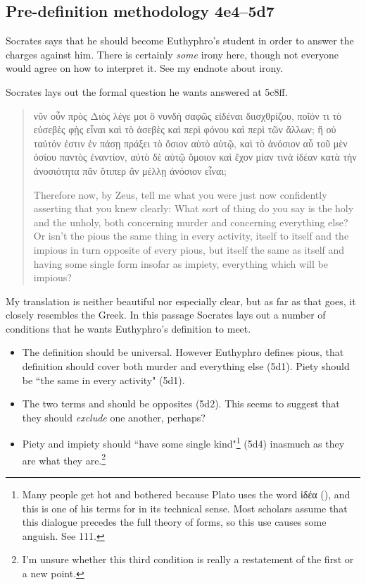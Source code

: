 \documentclass[11pt]{article}
\begin{document}

\subsection{Pre-definition methodology 4e4--5d7}

Socrates says that he should become Euthyphro's student in order to answer
the charges against him.  There is certainly \emph{some} irony here, though
not everyone would agree on how to interpret it.  See my endnote about
irony.

Socrates lays out the formal question he wants answered at 5c8ff.

\begin{quote}

    {\g
    νῦν οὖν πρὸς Διὸς λέγε μοι ὃ νυνδὴ σαφῶς εἰδέναι διισχθρίζου, ποῖόν τι
    τὸ εὐσεβὲς φῂς εἶναι καὶ τὸ ἀσεβὲς καὶ περὶ φόνου καὶ περὶ τῶν ἄλλων;
    ἢ οὐ ταὐτόν ἐστιν ἐν πάσῃ πράξει τὸ ὅσιον αὐτὸ αὑτῷ, καὶ τὸ ἀνόσιον αὖ
    τοῦ μὲν ὁσίου παντὸς ἐναντίον, αὐτὸ δὲ αὑτῷ ὅμοιον καὶ ἔχον μίαν τινὰ
    ἰδέαν κατὰ τὴν ἀνοσιότητα πᾶν ὅτιπερ ἂν μέλλῃ ἀνόσιον εἶναι;
    }

    Therefore now, by Zeus, tell me what you were just now confidently
    asserting that you knew clearly: What sort of thing do you say is the
    holy and the unholy, both concerning murder and concerning everything
    else? Or isn't the pious the same thing in every activity, itself to
    itself and the impious in turn opposite of every pious, but itself the
    same as itself and having some single form insofar as impiety,
    everything which will be impious?

\end{quote}

My translation is neither beautiful nor especially clear, but as far as
that goes, it closely resembles the Greek.  In this passage Socrates lays
out a number of conditions that he wants Euthyphro's definition to meet.

\begin{itemize}
    \item The definition should be universal.  However Euthyphro defines
        pious, that definition should cover both murder and everything else
        (5d1).  Piety should be ``the same in every activity" (5d1).
    \item The two terms  and  should be opposites
        (5d2).  This seems to suggest that they should \emph{exclude} one
        another, perhaps?
    \item Piety and impiety should ``have some single kind"\footnote{Many
        people get hot and bothered because Plato uses the word {\g ἰδέα}
        (), and this is one of his terms for  in
        its technical sense.  Most scholars assume that this dialogue
        precedes the full theory of forms, so this use causes some anguish.
        See \citet{burnet1924} 111.} (5d4) inasmuch as they are what they
        are.\footnote{I'm unsure whether this third condition is really a
        restatement of the first or a new point.}

\end{itemize}
\end{document}

